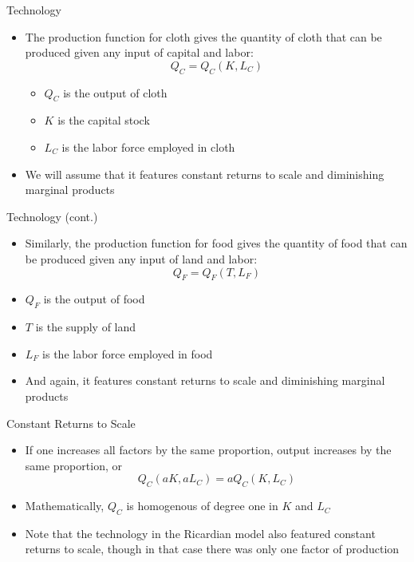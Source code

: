 \documentclass[10pt,hyperref={CJKbookmarks=true},xcolor=dvipsnames,aspectratio=169]{beamer}
\begin{document}
\begin{frame}{Technology}

\begin{itemize}
\item The production function for cloth gives the quantity of cloth that
can be produced given any input of capital and labor: 
\[
Q_{C}=Q_{C}(K,L_{C})
\]


\begin{itemize}
\item $Q_{C}$ is the output of cloth 
\item $K$ is the capital stock 
\item $L_{C}$ is the labor force employed in cloth 
\end{itemize}
\item We will assume that it features constant returns to scale and diminishing
marginal products 
\end{itemize}
\end{frame}

\begin{frame}{Technology (cont.) }

\begin{itemize}
\item Similarly, the production function for food gives the quantity of
food that can be produced given any input of land and labor:
\[
Q_{F}=Q_{F}(T,L_{F})
\]
 
\item $Q_{F}$ is the output of food
\item $T$ is the supply of land 
\item $L_{F}$ is the labor force employed in food 
\item And again, it features constant returns to scale and diminishing marginal
products
\end{itemize}
\end{frame}

\begin{frame}{Constant Returns to Scale}

\begin{itemize}
\item If one increases all factors by the same proportion, output increases
by the same proportion, or 
\[
Q_{C}(aK,aL_{C})=aQ_{C}(K,L_{C})
\]
 
\item Mathematically, $Q_{C}$ is homogenous of degree one in $K$ and $L_{C}$ 
\item Note that the technology in the Ricardian model also featured constant
returns to scale, though in that case there was only one factor of
production 
\end{itemize}
\end{frame}
\end{document}
